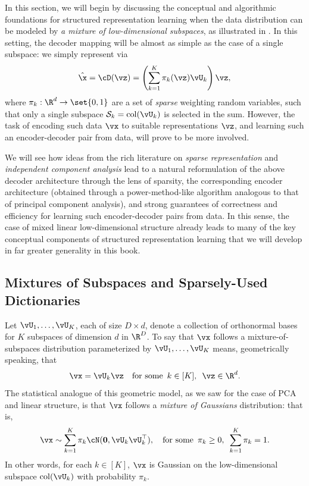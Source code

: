 \documentclass[../../book-main.tex]{subfiles}
\begin{document}
In this section, we will begin by discussing the conceptual and algorithmic
foundations for structured representation learning when the data distribution
can be modeled by {\em a mixture of low-dimensional subspaces}, as illustrated in . In this setting, the decoder mapping will be almost as simple as the case of a single subspace: we simply represent via
\begin{equation}\label{eq:mixture-subspaces-decoder-first-cut}
    \hat{\x} = \cD(\vz) = \left( \sum_{k=1}^K \pi_k(\vz)\vU_k \right) \vz,
\end{equation}
where $\pi_k : \R^d \to \set{0,1}$ are a set of \textit{sparse} weighting random
variables, such that only a single subspace $\mathcal{S}_k
= \mathop{\mathrm{col}}(\vU_k) $ is selected in the sum.
However, the task of encoding such data $\vx$ to suitable representations $\vz$, and learning such an encoder-decoder pair from data, will prove to be more involved.

We will see how ideas from the rich literature on \textit{sparse representation}
and \textit{independent component analysis} lead to a natural reformulation of
the above decoder architecture through the lens of sparsity, the corresponding
encoder architecture (obtained through a power-method-like algorithm analogous
to that of principal component analysis), and strong guarantees of correctness
and efficiency for learning such encoder-decoder pairs from data. In this sense,
the case of mixed linear low-dimensional structure already leads to many of the
key conceptual components of structured representation learning that we will develop in
far greater generality in this book.


\subsection{Mixtures of Subspaces and Sparsely-Used
Dictionaries}\label{sec:mixture-and-dict}


Let $\vU_1, \dots, \vU_K$, each of size $D \times d$, denote a collection of orthonormal bases for $K$ subspaces of dimension $d$ in $\R^D$.
To say that $\vx$ follows a mixture-of-subspaces distribution parameterized by $\vU_1, \dots, \vU_K$ means, geometrically speaking,
that 
\begin{equation}\label{eq:mixture-of-subspaces-geometric}
    \vx = \vU_k \vz  \quad \text{for some} \enspace k \in [K],\enspace \vz \in \R^d.
\end{equation}
The statistical analogue of this geometric model, as we saw for the case of PCA and linear structure,
is that $\vx$ follows a \textit{mixture of Gaussians} distribution: that is,
\begin{equation}\label{eq:mixture-of-subspaces-statistical}
    \vx \sim \sum_{k=1}^K \pi_k \cN(\mathbf{0}, \vU_k\vU_k^\top), \quad \text{for some} \enspace \pi_k \geq 0,\enspace \sum_{k=1}^K \pi_k = 1.
\end{equation}
In other words, for each $k \in [K]$, $\vx$ is Gaussian on the low-dimensional
subspace $\mathop{\mathrm{col}}(\vU_k)$  with probability $\pi_k$.
\end{document}
